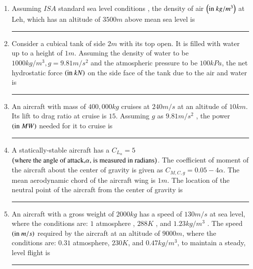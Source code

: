 \documentclass[journal]{IEEEtran}
\begin{document}
\begin{enumerate}
\item Assuming $ISA$ standard sea level conditions , the density of air $\left(\text{in } kg/m^3\right)$ at Leh, which has an altitude of $3500m$ above mean sea level is \rule{2cm}{0.2pt} 
\item Consider a cubical tank of side $2 m$ with its top open. It is filled with water up to a height of $1 m$. Assuming the density of water to be $1000 kg/m^3, g = 9.81 m/s^2$ and the atmospheric pressure to be $100 kPa$, the net hydrostatic force $\left(\text{in } kN\right)$ on the side face of the tank due to the air and water is \rule{2cm}{0.2pt} 
\item An aircraft with mass of $400,000 kg$ cruises at $240 m/s$ at an altitude of $10 km$. Its lift to drag ratio at cruise is $15$. Assuming $g$ as $9.81 m/s^2$ , the power $\left(\text{in } MW\right)$ needed for it to cruise is\rule{2cm}{0.2pt} 
\item A statically-stable aircraft has a $C_{L_{\alpha}}=5$ $\left(\text{where the angle of attack,} \alpha \text{, is measured in radians}\right)$. The coefficient of moment of the aircraft about the center of gravity is given as $C_{M,C,g}=0.05-4\alpha$. The mean aerodynamic chord of the aircraft wing is $1 m$. The location  of the neutral point of the aircraft from the center of gravity is \rule{2cm}{0.2pt} 

\item An aircraft with a gross weight of $2000kg$ has a speed of $130m/s$ at sea level, where the conditions are: $1$ atmosphere , $288K$ , and $1.23 kg/m^3$ . The speed $\left(\text{in } m/s\right)$ required by the aircraft at an altitude of $9000m$, where the conditions are: $0.31$ atmosphere, $230K$, and $0.47 kg/m^3$, to maintain a steady, level flight is \rule{2cm}{0.2pt}  
	\end{enumerate}
\end{document}
